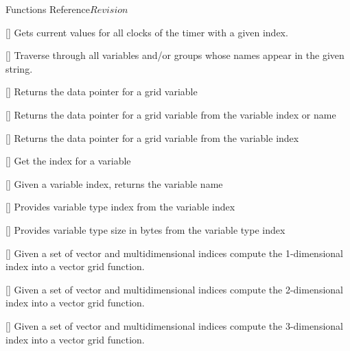 \begin{cactuspart}{ Functions Reference}{}{$Revision$}
\begin{Lentry}
\item[\code{CCTK\_TimerStopI}] [\pageref{CCTK-TimerStopI}]
  Gets current values for all clocks of the timer with a given index.

\item[\code{CCTK\_TraverseString}] [\pageref{CCTK-TraverseString}]
  Traverse through all variables and/or groups whose names appear in the given string.

\item[\code{CCTK\_VarDataPtr}] [\pageref{CCTK-VarDataPtr}]
  Returns the data pointer for a grid variable

\item[\code{CCTK\_VarDataPtrB}] [\pageref{CCTK-VarDataPtrB}]
  Returns the data pointer for a grid variable from the variable index or name

\item[\code{CCTK\_VarDataPtrI}] [\pageref{CCTK-VarDataPtrI}]
  Returns the data pointer for a grid variable from the variable index

\item[\code{CCTK\_VarIndex}]
   [\pageref{CCTK-VarIndex}]
  Get the index for a variable

\item[\code{CCTK\_VarName}] [\pageref{CCTK-VarName}]
  Given a variable index, returns the variable name

\item[\code{CCTK\_VarTypeI}] [\pageref{CCTK-VarTypeI}]
  Provides variable type index from the variable index

\item[\code{CCTK\_VarTypeSize}] [\pageref{CCTK-VarTypeSize}]
  Provides variable type size in bytes from the variable type index

\item[\code{CCTK\_VECTGFINDEX1D}] [\pageref{CCTK-VECTGFINDEX1D}]
  Given a set of vector and multidimensional indices compute the 1-dimensional
  index into a vector grid function.

\item[\code{CCTK\_VECTGFINDEX2D}] [\pageref{CCTK-VECTGFINDEX2D}]
  Given a set of vector and multidimensional indices compute the 2-dimensional
  index into a vector grid function.

\item[\code{CCTK\_VECTGFINDEX3D}] [\pageref{CCTK-VECTGFINDEX3D}]
  Given a set of vector and multidimensional indices compute the 3-dimensional
  index into a vector grid function.


\end{Lentry}
\end{cactuspart}
